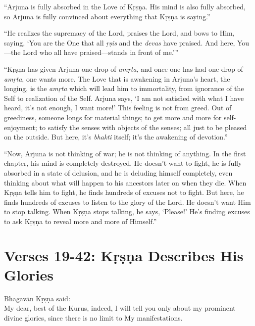 \enquote{Arjuna is fully absorbed in the Love of Kṛṣṇa. His mind is also fully absorbed, so Arjuna is fully convinced about everything that Kṛṣṇa is saying.}

\enquote{He realizes the supremacy of the Lord, praises the Lord, and bows to Him, saying, \enquote{You are the One that all \textit{ṛṣis} and the \textit{devas} have praised. And here, You---the Lord who all have praised---stands in front of me.}}

\enquote{Kṛṣṇa has given Arjuna one drop of \textit{amṛta}, and once one has had one drop of \textit{amṛta}, one wants more. The Love that is awakening in Arjuna’s heart, the longing, is the \textit{amṛta} which will lead him to immortality, from ignorance of the Self to realization of the Self. Arjuna says, \enquote{I am not satisfied with what I have heard, it’s not enough, I want more!} This feeling is not from greed. Out of greediness, someone longs for material things; to get more and more for self-enjoyment; to satisfy the senses with objects of the senses; all just to be pleased on the outside. But here, it’s \textit{bhakti} itself; it’s the awakening of devotion.}

\enquote{Now, Arjuna is not thinking of war; he is not thinking of anything. In the first chapter, his mind is completely destroyed. He doesn’t want to fight, he is fully absorbed in a state of delusion, and he is deluding himself completely, even thinking about what will happen to his ancestors later on when they die. When Kṛṣṇa tells him to fight, he finds hundreds of excuses not to fight. But here, he finds hundreds of excuses to listen to the glory of the Lord. He doesn’t want Him to stop talking. When Kṛṣṇa stops talking, he says, \enquote{Please!} He’s finding excuses to ask Kṛṣṇa to reveal more and more of Himself.}

\section{Verses 19-42: Kṛṣṇa Describes His Glories}\label{sec-verses-19-42-krsna-describes-his-glories}

{\hspace*{1em}Bhagavān Kṛṣṇa said: \\
My dear, best of the Kurus, indeed, I will tell you only about my prominent divine glories, since there is no limit to My manifestations.}

